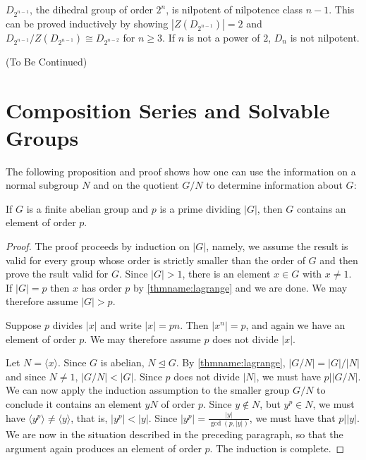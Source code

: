 \begin{eg}
    $D_{2^{n-1}}$, the dihedral group of order $2^n$, is nilpotent of nilpotence class $n-1$. This can be proved inductively by showing $|Z(D_{2^{n-1}})| = 2$ and $D_{2^{n-1}}/Z(D_{2^{n-1}}) \cong D_{2^{n-2}}$ for $n \geq 3$. If $n$ is not a power of $2$, $D_n$ is not nilpotent.
\end{eg}


(To Be Continued)


\section{\textsection Composition Series and Solvable Groups}

The following proposition and proof shows how one can use the information on a normal subgroup $N$ and on the quotient $G/N$ to determine information about $G$:

\begin{prop}
    If $G$ is a finite abelian group and $p$ is a prime dividing $|G|$, then $G$ contains an element of order $p$.
\end{prop}
\begin{proof}
    The proof proceeds by induction on $|G|$, namely, we assume the result is valid for every group whose order is strictly smaller than the order of $G$ and then prove the rsult valid for $G$. Since $|G| > 1$, there is an element $x \in G$ with $x \neq 1$. If $|G| = p$ then $x$ has order $p$ by \ref{thmname:lagrange} and we are done. We may therefore assume $|G| > p$.

    Suppose $p$ divides $|x|$ and write $|x| = pn$. Then $|x^n| = p$, and again we have an element of order $p$. We may therefore assume $p$ does not divide $|x|$.

    Let $N = \langle x\rangle$. Since $G$ is abelian, $N \trianglelefteq G$. By \ref{thmname:lagrange}, $|G/N| = |G|/|N|$ and since $N \neq 1$, $|G/N| < |G|$. Since $p$ does not divide $|N|$, we must have $p\vert |G/N|$. We can now apply the induction assumption to the smaller group $G/N$ to conclude it contains an element $yN$ of order $p$. Since $y \notin N$, but $y^p \in N$, we must have $\langle y^p\rangle \neq \langle y\rangle$, that is, $|y^p| < |y|$. Since $|y^p| = \frac{|y|}{\gcd(p,|y|)}$, we must have that $p\vert |y|$. We are now in the situation described in the preceding paragraph, so that the argument again produces an element of order $p$. The induction is complete.
\end{proof}

